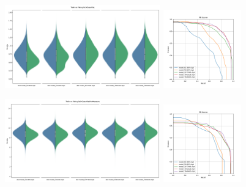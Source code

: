 \begin{figure}[!ht]
    \centering
    \includegraphics[width=0.6\textwidth]{../images/realworldexperiments/scarlatti/violinplots/TrainVsFake_pitchClassHist.png}
    \includegraphics[width=0.3\textwidth]{../images/realworldexperiments/scarlatti/prcurves/PRCurveScarlatti_pitchClassHist.png}
\end{figure}
\begin{figure}[!ht]
    \centering
    \includegraphics[width=0.6\textwidth]{../images/realworldexperiments/scarlatti/violinplots/TrainVsFake_pitchClassHistPerMeasure.png}
    \includegraphics[width=0.3\textwidth]{../images/realworldexperiments/scarlatti/prcurves/PRCurveScarlatti_pitchClassHistPerMeasure.png}
\end{figure}

